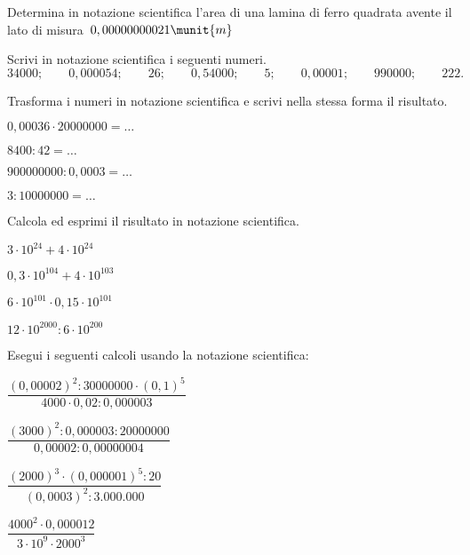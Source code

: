 \begin{esercizio}
 \label{ese:3.63}
Determina in notazione scientifica l'area di una lamina di ferro quadrata
avente il lato di misura~\(0,00000000021\munit{m}\)
\end{esercizio}

\begin{esercizio}
 \label{ese:3.64}
Scrivi in notazione scientifica i seguenti numeri.
\[34000;\qquad0,000054;\qquad26;\qquad0,54000;\qquad5;\qquad0,00001;
\qquad990000;\qquad222.\]
\end{esercizio}

\pagebreak

\begin{esercizio}
 \label{ese:3.65}
Trasforma i numeri in notazione scientifica e scrivi nella stessa forma il 
risultato.
\begin{htmulticols}{2}
\begin{enumeratees}
\item \(0,00036\cdot20000000=\ldots\)
\item \(8400:42=\ldots\)
\item \(900000000:0,0003=\ldots\)
\item \(3:10000000=\ldots\)
\end{enumeratees}
\end{htmulticols}
\end{esercizio}


\begin{esercizio}
 \label{ese:3.66}
Calcola ed esprimi il risultato in notazione scientifica.

\begin{htmulticols}{2}
\begin{enumeratees}
\item \(3\cdot10^{24} +4\cdot10^{24}\)
\item \(0,3\cdot10^{104} +4\cdot10^{103}\)
\item \(6\cdot10^{101}\cdot0,15\cdot10^{101}\)
\item \(12\cdot10^{2000}:6\cdot10^{200}\)
\end{enumeratees}
\end{htmulticols}
\end{esercizio}

\begin{esercizio}[*]
 \label{ese:3.67}
Esegui i seguenti calcoli usando la notazione scientifica:

\begin{htmulticols}{2}
\begin{enumeratees}
\item \(\dfrac{(0,00002)^2:30000000\cdot(0,1)^5}{4000 \cdot0,02:0,000003}\)
\item \(\dfrac{(3000)^2:0,000003:20000000}{0,00002:0,00000004}\)
\item \(\dfrac{(2000)^3 \cdot (0,000001)^5:20}{(0,0003)^2:3.000.000}\)
\item \(\dfrac{4000^2\cdot 0,000012}{3\cdot 10^9\cdot 2000^3}\)
\end{enumeratees}
\end{htmulticols}
\end{esercizio}

